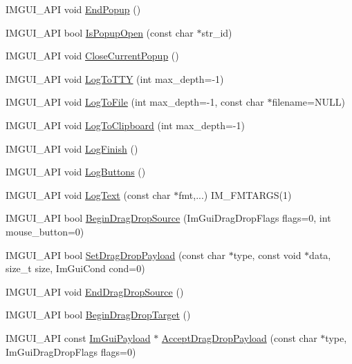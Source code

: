 \begin{DoxyCompactItemize}
\item 
I\+M\+G\+U\+I\+\_\+\+A\+PI void \hyperlink{namespace_im_gui_aa6a9b5696f2ea7eed7683425fc77b8f2}{End\+Popup} ()
\item 
I\+M\+G\+U\+I\+\_\+\+A\+PI bool \hyperlink{namespace_im_gui_a8f25c1565fca7cb9796c54e5cebc44ee}{Is\+Popup\+Open} (const char $\ast$str\+\_\+id)
\item 
I\+M\+G\+U\+I\+\_\+\+A\+PI void \hyperlink{namespace_im_gui_aeaec6479834db7918260fc082107f90b}{Close\+Current\+Popup} ()
\item 
I\+M\+G\+U\+I\+\_\+\+A\+PI void \hyperlink{namespace_im_gui_a37696f5296f33ae4218f53b40b81cccc}{Log\+To\+T\+TY} (int max\+\_\+depth=-\/1)
\item 
I\+M\+G\+U\+I\+\_\+\+A\+PI void \hyperlink{namespace_im_gui_ab62461a65c153b9f40842debef8aa755}{Log\+To\+File} (int max\+\_\+depth=-\/1, const char $\ast$filename=N\+U\+LL)
\item 
I\+M\+G\+U\+I\+\_\+\+A\+PI void \hyperlink{namespace_im_gui_a81add991d176834b8a6e315dfc78e4f7}{Log\+To\+Clipboard} (int max\+\_\+depth=-\/1)
\item 
I\+M\+G\+U\+I\+\_\+\+A\+PI void \hyperlink{namespace_im_gui_a2ebcd048d1ca025fb972e1c2e920e3f3}{Log\+Finish} ()
\item 
I\+M\+G\+U\+I\+\_\+\+A\+PI void \hyperlink{namespace_im_gui_a7bd295da4be19bab98262c76fcaeb4fb}{Log\+Buttons} ()
\item 
I\+M\+G\+U\+I\+\_\+\+A\+PI void \hyperlink{namespace_im_gui_aa548475d8f771ab6524d73d900a41198}{Log\+Text} (const char $\ast$fmt,...) I\+M\+\_\+\+F\+M\+T\+A\+R\+GS(1)
\item 
I\+M\+G\+U\+I\+\_\+\+A\+PI bool \hyperlink{namespace_im_gui_a590c12f5ca1fe864f68d5c74a6f72adc}{Begin\+Drag\+Drop\+Source} (Im\+Gui\+Drag\+Drop\+Flags flags=0, int mouse\+\_\+button=0)
\item 
I\+M\+G\+U\+I\+\_\+\+A\+PI bool \hyperlink{namespace_im_gui_adc77aecd872e578e347d8bc0dfcfa663}{Set\+Drag\+Drop\+Payload} (const char $\ast$type, const void $\ast$data, size\+\_\+t size, Im\+Gui\+Cond cond=0)
\item 
I\+M\+G\+U\+I\+\_\+\+A\+PI void \hyperlink{namespace_im_gui_a02f225fefff2a046038ed99ab20606da}{End\+Drag\+Drop\+Source} ()
\item 
I\+M\+G\+U\+I\+\_\+\+A\+PI bool \hyperlink{namespace_im_gui_ac42384c3181406bbd0f3f4f77a73c7ed}{Begin\+Drag\+Drop\+Target} ()
\item 
I\+M\+G\+U\+I\+\_\+\+A\+PI const \hyperlink{struct_im_gui_payload}{Im\+Gui\+Payload} $\ast$ \hyperlink{namespace_im_gui_a5e0dac39e249bf50e2ae96dc4a97cb18}{Accept\+Drag\+Drop\+Payload} (const char $\ast$type, Im\+Gui\+Drag\+Drop\+Flags flags=0)

\end{DoxyCompactItemize}
